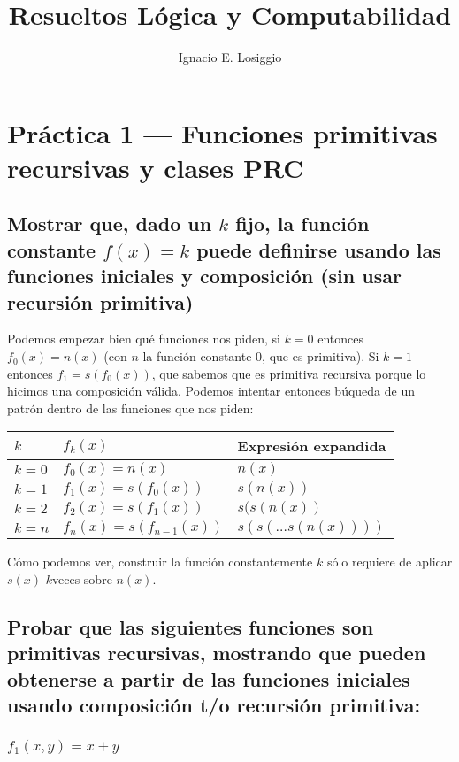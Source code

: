 \documentclass[fleqn, 11pt]{article}
\title{Resueltos Lógica y Computabilidad}
\author{Ignacio E. Losiggio}
\begin{document}
\maketitle

\section{Práctica 1 --- Funciones primitivas recursivas y clases PRC}

\subsection{Mostrar que, dado un $k$ fijo, la función constante $f(x) = k$
puede definirse usando las funciones iniciales y composición (sin usar
recursión primitiva)}

Podemos empezar bien qué funciones nos piden, si $k = 0$  entonces
$f_0(x) = n(x)$ (con $n$ la función constante $0$, que es primitiva). Si
$k = 1$ entonces $f_1 = s(f_0(x))$, que sabemos que es primitiva recursiva
porque lo hicimos una composición válida. Podemos intentar entonces
búqueda de un patrón dentro de las funciones que nos piden:
\begin{center}
	\begin{tabular}{lll}
		$k$     & $f_k(x)$ & Expresión expandida \\ \toprule
		$k = 0$ & $f_0(x) = n(x)$          & $n(x)$ \\
		$k = 1$ & $f_1(x) = s(f_0(x))$     & $s(n(x))$ \\
		$k = 2$ & $f_2(x) = s(f_1(x))$     & $s(s(n(x))$ \\
		$k = n$ & $f_n(x) = s(f_{n-1}(x))$ & $s(s(\dots s(n(x))))$ \\
	\end{tabular}
\end{center}

Cómo podemos ver, construir la función constantemente $k$ sólo requiere de
aplicar $s(x)$ $k$veces sobre $n(x)$.

\subsection{Probar que las siguientes funciones son primitivas recursivas,
mostrando que pueden obtenerse a partir de las funciones iniciales usando
composición t/o recursión primitiva:}

\subsubsection{$f_1(x, y) = x + y$}
\end{document}
